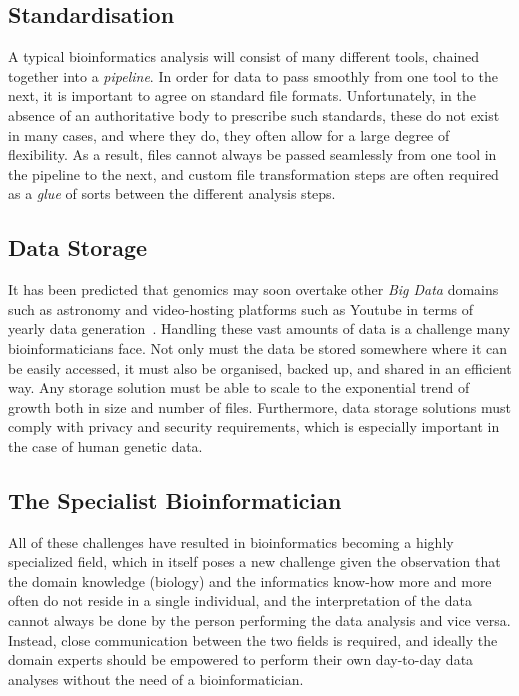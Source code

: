 \begin{justify}
\subsection{Standardisation}
A typical bioinformatics analysis will consist of many different tools, chained together into a \emph{pipeline}. In order for data to pass smoothly from one tool to the next, it is important to agree on standard file formats. Unfortunately, in the absence of an authoritative body to prescribe such standards, these do not exist in many cases, and where they do, they often allow for a large degree of flexibility. As a result, files cannot always be passed seamlessly from one tool in the pipeline to the next, and custom file transformation steps are often required as a \emph{glue} of sorts between the different analysis steps.


\subsection{Data Storage}

It has been predicted that genomics may soon overtake other \emph{Big Data} domains such as astronomy and video-hosting platforms such as Youtube in terms of yearly data generation~\cite{Stephens2015}. Handling these vast amounts of data is a challenge many bioinformaticians face. Not only must the data be stored somewhere where it can be easily accessed, it must also be organised, backed up, and shared in an efficient way. Any storage solution must be able to scale to the exponential trend of growth both in size and number of files. Furthermore, data storage solutions must comply with privacy and security requirements, which is especially important in the case of human genetic data.


\subsection{The Specialist Bioinformatician}
All of these challenges have resulted in bioinformatics becoming a highly specialized field, which in itself poses a new challenge given the observation that the domain knowledge (biology) and the informatics know-how more and more often do not reside in a single individual, and the interpretation of the data cannot always be done by the person performing the data analysis and vice versa. Instead, close communication between the two fields is required, and ideally the domain experts should be empowered to perform their own day-to-day data analyses without the need of a bioinformatician.



\end{justify}
